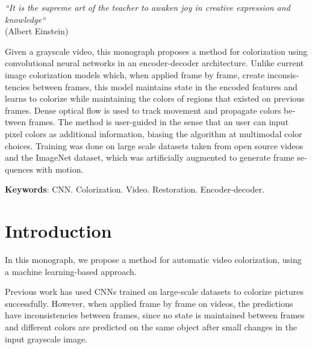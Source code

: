 \documentclass[12pt,openright,oneside,a4paper,english]{abntex2}
\begin{document}
\begin{otherlanguage}{english}
\begin{epigrafe}
\begin{flushright}
\textit{``It is the supreme art of the teacher to awaken joy in creative expression and knowledge``}\\
(Albert Einstein)
\par\end{flushright}\end{epigrafe} %

\begin{resumo}
Given a grayscale video, this monograph proposes a method for colorization using convolutional neural networks in an encoder-decoder architecture. Unlike current image colorization models which, when applied frame by frame, create inconsistencies between frames, this model maintains state in the encoded features and learns to colorize while maintaining the colors of regions that existed on previous frames. Dense optical flow is used to track movement and propagate colors between frames. The method is user-guided in the sense that an user can input pixel colors as additional information, biasing the algorithm at multimodal color choices. Training was done on large scale datasets taken from open source videos and the ImageNet dataset, which was artificially augmented to generate frame sequences with motion.
\vspace{\onelineskip}

\noindent
\textbf{Keywords}: CNN. Colorization. Video. Restoration. Encoder-decoder.
\end{resumo}


\cleardoublepage
\listoffigures
\newpage
\listoftables
\newpage
\tableofcontents

\maketitle
{}
\pagestyle{plain}

\chapter{Introduction}
In this monograph, we propose a method for automatic video colorization, using a machine learning-based approach.

Previous work \cite{colorful} has used CNNs trained on large-scale datasets to colorize pictures successfully. However, when applied frame by frame on videos, the predictions have inconsistencies between frames, since no state is maintained between frames and different colors are predicted on the same object after small changes in the input grayscale image.


\end{otherlanguage}
\end{document}
